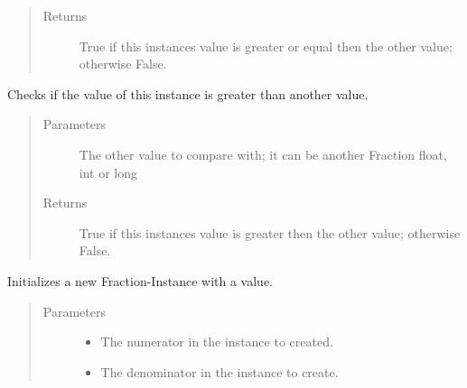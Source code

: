 \documentclass[letterpaper,10pt,english]{sphinxmanual}
\begin{document}
\begin{fulllineitems}
\begin{fulllineitems}
\begin{quote}
\begin{description}
\item[{Returns}] \leavevmode
True if this instances value is greater or equal then the other value; otherwise False.

\end{description}\end{quote}

\end{fulllineitems}


\begin{fulllineitems}
\label{\detokenize{fraction:fraction.Fraction.__gt__}}
Checks if the value of this instance is greater than another value.
\begin{quote}\begin{description}
\item[{Parameters}] \leavevmode
{} \textendash{} The other value to compare with; it can be another Fraction float, int or long

\item[{Returns}] \leavevmode
True if this instances value is greater then the other value; otherwise False.

\end{description}\end{quote}

\end{fulllineitems}


\begin{fulllineitems}
\label{\detokenize{fraction:fraction.Fraction.__init__}}
Initializes a new Fraction-Instance with a value.
\begin{quote}\begin{description}
\item[{Parameters}] \leavevmode\begin{itemize}
\item {} 
 \textendash{} The numerator in the instance to created.

\item {} 
 \textendash{} The denominator in the instance to create.

\end{itemize}


\end{description}
\end{quote}
\end{fulllineitems}
\end{fulllineitems}
\end{document}

